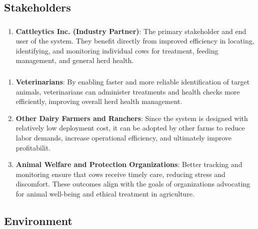 \documentclass{article}
\begin{document}
\subsection{Stakeholders}

\subsubsection*{\color{blue}{Direct Stakeholders}}
\begin{enumerate}
    \item\textbf{Cattleytics Inc. (Industry Partner)}: The primary stakeholder 
          and end user of the system. They benefit directly from improved efficiency 
          in locating, identifying, and monitoring individual cows for treatment, 
          feeding management, and general herd health.
    \end{enumerate}


\subsubsection*{\color{blue}{Indirect Stakeholders}}
\begin{enumerate}
    \item \textbf{Veterinarians}: By enabling faster and more reliable identification of target animals, 
            veterinarians can administer treatments and health checks more efficiently, improving overall herd health management.
    \item \textbf{Other Dairy Farmers and Ranchers}: Since the system is designed with relatively low deployment cost, it can be adopted by other farms to reduce 
            labor demands, increase operational efficiency, and ultimately improve profitabilit.
    \item \textbf{Animal Welfare and Protection Organizations}: Better tracking and monitoring ensure that cows receive 
            timely care, reducing stress and discomfort. These outcomes align with the goals of organizations advocating 
            for animal well-being and ethical treatment in agriculture.
\end{enumerate}


\subsection{Environment}
\end{document}
